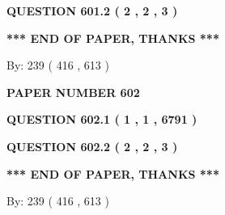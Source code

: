 \documentclass[12pt]{article}
\begin{document}
{\textbf{\Large{QUESTION
601.2 
 ( 2 , 2 , 3 )
}}}
  
  
   
   
 \vspace{0.2in}
 
   
   
   
   
\vspace{1.0in} 
{\textbf{\large{ *** END OF PAPER, THANKS *** }}} 
   
   
\hspace{1.0in} By: 
 239 ( 416 ,  613 )
   
   
   
   
\newpage 
\setcounter{page}{ 
   602001 } 
   
   
   
   
 {\textbf{ \Large{ PAPER NUMBER  602  }}}
   
   
\vspace{0.2in}
   
   
   
   
   
   
 \vspace{0.2in}
 
 
 
 
   
   
  
\vspace{0.2in}
  
{\textbf{\Large{QUESTION
602.1 
 ( 1 , 1 , 6791 )
}}}
  
  
  
\vspace{0.2in}
  
{\textbf{\Large{QUESTION
602.2 
 ( 2 , 2 , 3 )
}}}
  
  
   
   
 \vspace{0.2in}
 
   
   
   
   
\vspace{1.0in} 
{\textbf{\large{ *** END OF PAPER, THANKS *** }}} 
   
   
\hspace{1.0in} By: 
 239 ( 416 ,  613 )
   
   
   
   
\newpage 
\setcounter{page}{ 
   603001 } 
   
   
   
\end{document}

